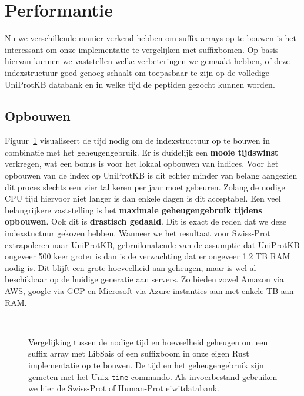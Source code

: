 \section{Performantie}\label{sec:performantie}
Nu we verschillende manier verkend hebben om suffix arrays op te bouwen is het interessant om onze implementatie te vergelijken met suffixbomen.
Op basis hiervan kunnen we vaststellen welke verbeteringen we gemaakt hebben, of deze indexstructuur goed genoeg schaalt om toepasbaar te zijn op de volledige UniProtKB databank en in welke tijd de peptiden gezocht kunnen worden.

\subsection{Opbouwen}
Figuur~\ref{fig:array_building} visualiseert de tijd nodig om de indexstructuur op te bouwen in combinatie met het geheugengebruik.
Er is duidelijk een \textbf{mooie tijdswinst} verkregen, wat een bonus is voor het lokaal opbouwen van indices.
Voor het opbouwen van de index op UniProtKB is dit echter minder van belang aangezien dit proces slechts een vier tal keren per jaar moet gebeuren.
Zolang de nodige CPU tijd hiervoor niet langer is dan enkele dagen is dit acceptabel.
Een veel belangrijkere vaststelling is het \textbf{maximale geheugengebruik tijdens opbouwen}.
Ook dit is \textbf{drastisch gedaald}.
Dit is exact de reden dat we deze indexstuctuur gekozen hebben.
Wanneer we het resultaat voor Swiss-Prot extrapoleren naar UniProtKB, gebruikmakende van de assumptie dat UniProtKB ongeveer 500 keer groter is dan is de verwachting dat er ongeveer 1.2 TB RAM nodig is.
Dit blijft een grote hoeveelheid aan geheugen, maar is wel al beschikbaar op de huidige generatie aan servers.
Zo bieden zowel Amazon via AWS, google via GCP en Microsoft via Azure instanties aan met enkele TB aan RAM\@.

\begin{figure}[H]
    \centering
    \\[4ex] %

    \caption{Vergelijking tussen de nodige tijd en hoeveelheid geheugen om een suffix array met LibSais of een suffixboom in onze eigen Rust implementatie op te bouwen. De tijd en het geheugengebruik zijn gemeten met het Unix \texttt{time} commando. Als invoerbestand gebruiken we hier de Swiss-Prot of Human-Prot eiwitdatabank.}\label{fig:array_building}
\end{figure}

